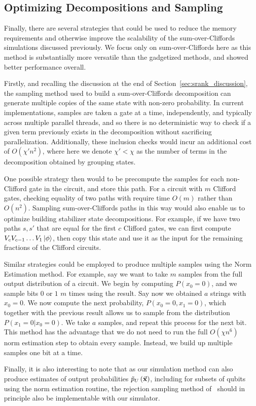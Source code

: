\subsection{Optimizing Decompositions and Sampling}\label{sec:general_optimizations}
Finally, there are several strategies that could be used to reduce the memory requirements and otherwise improve the scalability of the sum-over-Cliffords simulations discussed previously. We focus only on sum-over-Cliffords here as this method is substantially more versatile than the gadgetized methods, and showed better performance overall.\par
Firstly, and recalling the discussion at the end of Section~\ref{sec:srank_discussion}, the sampling method used to build a sum-over-Cliffords decomposition can generate multiple copies of the same state with non-zero probability. In current implementations, samples are taken a gate at a time, independently, and typically across multiple parallel threads, and so there is no deterministic way to check if a given term previously exists in the decomposition without sacrificing parallelization. Additionally, these inclusion checks would incur an additional cost of $O(\chi' n^{2})$, where here we denote $\chi' < \chi$ as the number of terms in the decomposition obtained by grouping states.\par
One possible strategy then would to be precompute the samples for each non-Clifford gate in the circuit, and store this path. For a circuit with $m$ Clifford gates, checking equality of two paths with require time $O(m)$ rather than $O(n^{2})$. Sampling sum-over-Cliffords paths in this way would also enable us to optimize building stabilizer state decompositions. For example, if we have two paths $s, s'$ that are equal for the first $c$ Clifford gates, we can first compute $V_{c}V_{c-1}\dots V_{1}\ket{\phi}$, then copy this state and use it as the input for the remaining fractions of the Clifford circuits.\par
Similar strategies could be employed to produce multiple samples using the Norm Estimation method. For example, say we want to take $m$ samples from the full output distribution of a circuit. We begin by computing $P(x_{0}=0)$, and we sample bits $0$ or $1$ $m$ times using the result. Say now we obtained $a$ strings with $x_{0}=0$. We now compute the next probability, $P\left(x_{0}=0,x_{1}=0\right)$, which together with the previous result allows us to sample from the distribution $P\left(x_{1}=0|x_{0}=0\right)$. We take $a$ samples, and repeat this process for the next bit. This method has the advantage that we do not need to run the full $O\left(\chi n^{6}\right)$ norm estimation step to obtain every sample. Instead, we build up multiple samples one bit at a time.\par
Finally, it is also interesting to note that as our simulation method can also produce estimates of output probabilities $\tilde{p}_{U}\left(\va{x}\right)$, including for subsets of qubits using the norm estimation routine, the rejection sampling method of~\cite{Villalonga2018} should in principle also be implementable with our simulator.